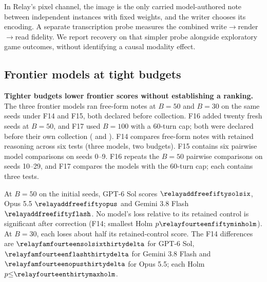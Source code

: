 In Relay's pixel channel, the image is the only carried model-authored note between independent instances with fixed weights, and the writer chooses its encoding. A separate transcription probe measures the combined write$\to$render$\to$read fidelity. We report recovery on that simpler probe alongside exploratory game outcomes, without identifying a causal modality effect.

\subsection{Frontier models at tight budgets}\label{app:frontier}
\begin{table}[htbp]
\centering
\small
\caption{Mean board accuracy (fraction of keys correct) for the three frontier added models, their retained-reasoning controls and the budget-matched sound reference. Initial free-form and reference means use seeds 0--9; the 40-seed reference mean at $B{=}30$ is $\relayfloorbthirty$. F14 gives free-form-minus-retained differences; the lower panel gives paired model differences. F15 uses seeds 0--9; F16 uses fresh seeds 10--29 at $B{=}50$; F17 uses the 60-turn-cap condition at $B{=}100$. Each family is Holm-corrected within itself. Turn counts in the headings are caps; early guesses are allowed. The reference was not run with the 60-turn cap.}
\label{tab:frontier}

\end{table}

\textbf{Tighter budgets lower frontier scores without establishing a ranking.} The three frontier models ran free-form notes at $B{=}50$ and $B{=}30$ on the same seeds under F14 and F15, both declared before collection. F16 added twenty fresh seeds at $B{=}50$, and F17 used $B{=}100$ with a 60-turn cap; both were declared before their own collection ( and ). F14 compares free-form notes with retained reasoning across six tests (three models, two budgets). F15 contains six pairwise model comparisons on seeds 0--9. F16 repeats the $B{=}50$ pairwise comparisons on seeds 10--29, and F17 compares the models with the 60-turn cap; each contains three tests.

At $B{=}50$ on the initial seeds, GPT-6 Sol scores $\relayaddfreefiftysolsix$, Opus 5.5 $\relayaddfreefiftyopus$ and Gemini 3.8 Flash $\relayaddfreefiftyflash$. No model's loss relative to its retained control is significant after correction (F14; smallest Holm $p\relayfourteenfiftyminholm$). At $B{=}30$, each loses about half its retained-control score. The F14 differences are $\relayfamfourteensolsixthirtydelta$ for GPT-6 Sol, $\relayfamfourteenflashthirtydelta$ for Gemini 3.8 Flash and $\relayfamfourteenopusthirtydelta$ for Opus 5.5; each Holm $p{\leq}\relayfourteenthirtymaxholm$.

